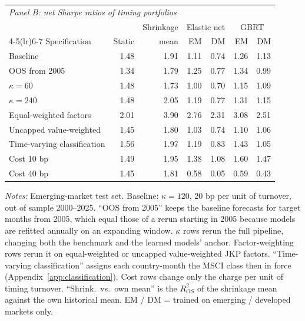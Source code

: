 \begin{table}[!ht]
\vspace{10pt}
\begin{tabular}{lrrrrrr}
\toprule
\multicolumn{7}{l}{\textit{Panel B: net Sharpe ratios of timing portfolios}} \\
\addlinespace
 & & Shrinkage & \multicolumn{2}{c}{Elastic net} & \multicolumn{2}{c}{GBRT} \\
\cmidrule(lr){4-5}\cmidrule(lr){6-7}
Specification & Static & mean & EM & DM & EM & DM \\
\midrule
Baseline & 1.48 & 1.91 & 1.11 & 0.74 & 1.26 & 1.13 \\
OOS from 2005 & 1.34 & 1.79 & 1.25 & 0.77 & 1.34 & 0.99 \\
$\kappa = 60$ & 1.48 & 1.73 & 1.00 & 0.70 & 1.15 & 1.09 \\
$\kappa = 240$ & 1.48 & 2.05 & 1.19 & 0.77 & 1.31 & 1.15 \\
Equal-weighted factors & 2.01 & 3.90 & 2.76 & 2.31 & 3.08 & 2.51 \\
Uncapped value-weighted & 1.45 & 1.80 & 1.03 & 0.74 & 1.10 & 1.06 \\
Time-varying classification & 1.56 & 1.97 & 1.19 & 0.83 & 1.43 & 1.05 \\
Cost 10 bp & 1.49 & 1.95 & 1.38 & 1.08 & 1.60 & 1.47 \\
Cost 40 bp & 1.45 & 1.81 & 0.58 & 0.05 & 0.59 & 0.43 \\
\bottomrule
\end{tabular}

\vspace{4pt}
\begin{minipage}{0.97\linewidth}\footnotesize
\textit{Notes:} Emerging-market test set. Baseline: $\kappa=120$, 20 bp per unit of turnover, out of sample 2000--2025. ``OOS from 2005'' keeps the baseline forecasts for target months from 2005, which equal those of a rerun starting in 2005 because models are refitted annually on an expanding window. $\kappa$ rows rerun the full pipeline, changing both the benchmark and the learned models' anchor. Factor-weighting rows rerun it on equal-weighted or uncapped value-weighted JKP factors. ``Time-varying classification'' assigns each country-month the MSCI class then in force (Appendix~\ref{app:classification}). Cost rows change only the charge per unit of timing turnover. ``Shrink.\ vs.\ own mean'' is the $R^2_{OS}$ of the shrinkage mean against the own historical mean. EM / DM = trained on emerging / developed markets only.
\end{minipage}
\end{table}
